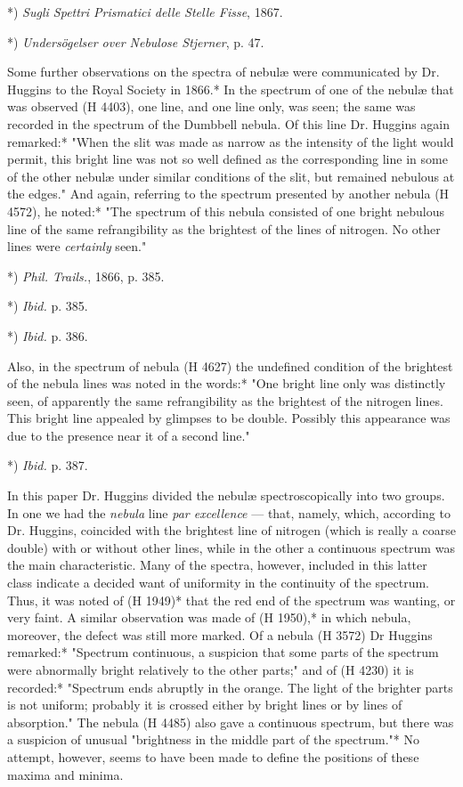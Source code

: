 \documentclass[a4paper, 12pt, oneside, polutonikogreek, english]{article}
\begin{document}
*) \emph{Sugli Spettri Prismatici delle Stelle Fisse}, 1867.

*) \emph{Undersögelser over Nebulose Stjerner}, p. 47.

Some further observations on the spectra of nebulæ were communicated by Dr. Huggins to the Royal Society in 1866.* In the spectrum of one of the nebulæ that was observed (H 4403), one line, and one line only, was seen; the same was recorded in the spectrum of the Dumbbell nebula. Of this line Dr. Huggins again remarked:* "When the slit was made as narrow as the intensity of the light would permit, this bright line was not so well defined as the corresponding line in some of the other nebulæ under similar conditions of the slit, but remained nebulous at the edges." And again, referring to the spectrum presented by another nebula (H 4572), he noted:* "The spectrum of this nebula consisted of one bright nebulous line of the same refrangibility as the brightest of the lines of nitrogen. No other lines were \emph{certainly} seen."

*) \emph{Phil. Trails.}, 1866, p. 385.

*) \emph{Ibid.} p. 385.

*) \emph{Ibid.} p. 386.

Also, in the spectrum of nebula (H 4627) the undefined condition of the brightest of the nebula lines was noted in the words:* "One bright line only was distinctly seen, of apparently the same refrangibility as the brightest of the nitrogen lines. This bright line appealed by glimpses to be double. Possibly this appearance was due to the presence near it of a second line."

*) \emph{Ibid.} p. 387.

In this paper Dr. Huggins divided the nebulæ spectroscopically into two groups. In one we had the \emph{nebula} line \emph{par excellence} --- that, namely, which, according to Dr. Huggins, coincided with the brightest line of nitrogen (which is really a coarse double) with or without other lines, while in the other a continuous spectrum was the main characteristic. Many of the spectra, however, included in this latter class indicate a decided want of uniformity in the continuity of the spectrum. Thus, it was noted of (H 1949)* that the red end of the spectrum was wanting, or very faint. A similar observation was made of (H 1950),* in which nebula, moreover, the defect was still more marked. Of a nebula (H 3572) Dr Huggins remarked:* "Spectrum continuous, a suspicion that some parts of the spectrum were abnormally bright relatively to the other parts;" and of (H 4230) it is recorded:* "Spectrum ends abruptly in the orange. The light of the brighter parts is not uniform; probably it is crossed either by bright lines or by lines of absorption." The nebula (H 4485) also gave a continuous spectrum, but there was a suspicion of unusual "brightness in the middle part of the spectrum."* No attempt, however, seems to have been made to define the positions of these maxima and minima.
\end{document}
